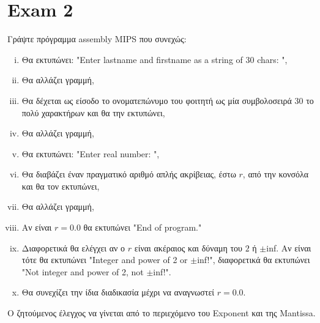 \documentclass{article}
\begin{document}
\section*{Exam 2}
Γράψτε πρόγραμμα assembly MIPS που συνεχώς:
\begin{enumerate}[i.]
    \itemsep0em
    \item Θα εκτυπώνει: "Enter lastname and firstname as a string of $30$ chars: ",
    \item Θα αλλάζει γραμμή,
    \item Θα δέχεται ως είσοδο το ονοματεπώνυμο του φοιτητή ως μία συμβολοσειρά $30$ το πολύ χαρακτήρων και θα την εκτυπώνει,
    \item Θα αλλάζει γραμμή,
    \item Θα εκτυπώνει: "Enter real number: ",
    \item Θα διαβάζει έναν πραγματικό αριθμό απλής ακρίβειας, έστω $r$, από την κονσόλα και θα τον εκτυπώνει,
    \item Θα αλλάζει γραμμή,
    \item Αν είναι $r=0.0$ θα εκτυπώνει "End of program."
    \item Διαφορετικά θα ελέγχει αν ο $r$ είναι ακέραιος και δύναμη του $2$ ή $\pm$inf.
    Αν είναι τότε θα εκτυπώνει "Integer and power of 2 or $\pm$inf!", διαφορετικά θα εκτυπώνει
    "Not integer and power of 2, not $\pm$inf!".
    \item Θα συνεχίζει την ίδια διαδικασία μέχρι να αναγνωστεί $r=0.0$.
\end{enumerate}
Ο ζητούμενος έλεγχος να γίνεται από το περιεχόμενο του Exponent και της Mantissa.
\end{document}
